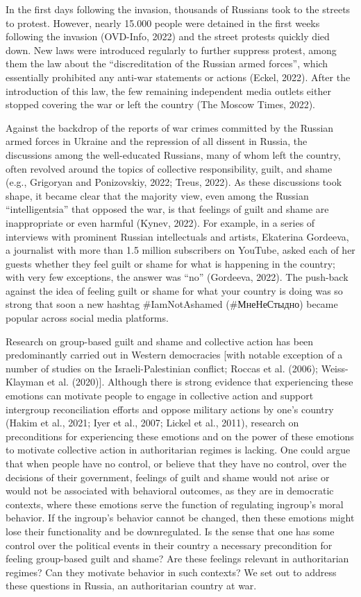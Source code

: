 \documentclass[
]{article}
\begin{document}
In the first days following the invasion, thousands of Russians took to the streets to protest. However, nearly 15.000 people were detained in the first weeks following the invasion (OVD-Info, 2022) and the street protests quickly died down. New laws were introduced regularly to further suppress protest, among them the law about the ``discreditation of the Russian armed forces'', which essentially prohibited any anti-war statements or actions (Eckel, 2022). After the introduction of this law, the few remaining independent media outlets either stopped covering the war or left the country (The Moscow Times, 2022).

Against the backdrop of the reports of war crimes committed by the Russian armed forces in Ukraine and the repression of all dissent in Russia, the discussions among the well-educated Russians, many of whom left the country, often revolved around the topics of collective responsibility, guilt, and shame (e.g., Grigoryan and Ponizovskiy, 2022; Treus, 2022). As these discussions took shape, it became clear that the majority view, even among the Russian ``intelligentsia'' that opposed the war, is that feelings of guilt and shame are inappropriate or even harmful (Kynev, 2022). For example, in a series of interviews with prominent Russian intellectuals and artists, Ekaterina Gordeeva, a journalist with more than 1.5 million subscribers on YouTube, asked each of her guests whether they feel guilt or shame for what is happening in the country; with very few exceptions, the answer was ``no'' (Gordeeva, 2022). The push-back against the idea of feeling guilt or shame for what your country is doing was so strong that soon a new hashtag \#IamNotAshamed (\#МнеНеСтыдно) became popular across social media platforms.

Research on group-based guilt and shame and collective action has been predominantly carried out in Western democracies {[}with notable exception of a number of studies on the Israeli-Palestinian conflict; Roccas et al. (2006); Weiss-Klayman et al. (2020){]}. Although there is strong evidence that experiencing these emotions can motivate people to engage in collective action and support intergroup reconciliation efforts and oppose military actions by one's country (Hakim et al., 2021; Iyer et al., 2007; Lickel et al., 2011), research on preconditions for experiencing these emotions and on the power of these emotions to motivate collective action in authoritarian regimes is lacking. One could argue that when people have no control, or believe that they have no control, over the decisions of their government, feelings of guilt and shame would not arise or would not be associated with behavioral outcomes, as they are in democratic contexts, where these emotions serve the function of regulating ingroup's moral behavior. If the ingroup's behavior cannot be changed, then these emotions might lose their functionality and be downregulated. Is the sense that one has some control over the political events in their country a necessary precondition for feeling group-based guilt and shame? Are these feelings relevant in authoritarian regimes? Can they motivate behavior in such contexts? We set out to address these questions in Russia, an authoritarian country at war.
\end{document}
